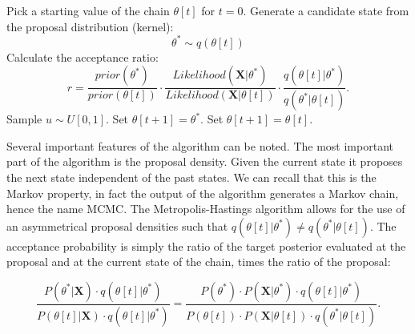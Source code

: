 \begin{algorithm}[H]
\centering
\begin{algorithmic}[1]
%
\State Pick a starting value of the chain $\theta \left[ t \right]$ for $t=0$.
%
%
\State Generate a candidate state from the proposal distribution (kernel):
$$\theta^{*} \sim q(\theta[t])$$
%
\State Calculate the acceptance ratio:
$$r=\frac{prior\left(\theta^{*}\right)}{prior\left(\theta\left[t\right]\right)}\cdot\frac{Likelihood\left(\mathbf{X}|\theta^{*}\right)}{Likelihood\left(\mathbf{X}|\theta\left[t\right]\right)}\cdot\frac{q\left(\theta\left[t\right]|\theta^{*}\right)}{q\left(\theta^{*}|\theta\left[t\right]\right)}.$$
%
\State Sample $u\sim U[0,1]$.
%
%
\State Set $\theta[t+1]=\theta^*.$
%
\Else 
%
\State Set $\theta[t+1]=\theta[t].$
%
\EndIf
%
\EndFor
\end{algorithmic}
\caption{
{ \footnotesize 
{\bf The Metropolis-Hastings algorithm} 
}%
}
\label{alg:metropolisHastings}
\end{algorithm}

Several important features of the algorithm can be noted.
The most important part of the algorithm is the proposal density. 
Given the current state it proposes the next state independent of the past states.
We can recall that this is the Markov property, in fact the output of the algorithm generates a Markov chain, hence the name MCMC.
The Metropolis-Hastings algorithm allows for the use of an asymmetrical proposal densities such that $q\left(\theta\left[t\right]|\theta^{*}\right)\neq q\left(\theta^{*}|\theta\left[t\right]\right)$.
The acceptance probability is simply the ratio of the target posterior evaluated at the proposal and at the current state of the chain, times the ratio of the proposal: 

\begin{equation}
\frac{P\left(\theta^{*}|\mathbf{X}\right)\cdot q\left(\theta\left[t\right]|\theta^{*}\right)}{P\left(\theta\left[t\right]|\mathbf{X}\right)\cdot q\left(\theta\left[t\right]|\theta^{*}\right)}=\frac{P(\theta^{*})\cdot P\left(\mathbf{X}|\theta^{*}\right)\cdot q\left(\theta\left[t\right]|\theta^{*}\right)}{P(\theta\left[t\right])\cdot P\left(\mathbf{X}|\theta\left[t\right]\right)\cdot q\left(\theta^{*}|\theta\left[t\right]\right)}.
\label{eq:metropolis1}
\end{equation}

